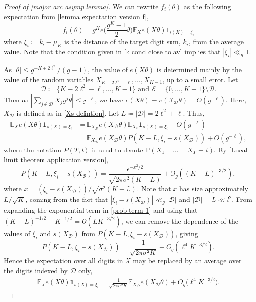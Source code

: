 \documentclass[hidelinks,11pt,reqno]{amsart}
\renewcommand{\leq}{\leqslant}
\newcommand{\E}{\ensuremath{\mathbb{E}}}
\newcommand{\prob}{\ensuremath{\mathbb{P}}}
\newcommand{\ind}{\mathbf{1}}
\newcommand{\xb}{X}
\newcommand{\xbd}{X_{\mathcal{D}}}
\newcommand{\xbee}{X_{\mathcal{E}}}
\newcommand{\sx}[1]{s(#1)}
\theoremstyle{remark}
\begin{document}
\begin{proof}[Proof of \cref{major arc asymp lemma}]
We can rewrite $f_{i}(\theta)$ as the following expectation from \cref{lemma expectation version f}, 
 \begin{equation}\label{equation f exp major arc}    
f_{i}(\theta)=g^{K}e\Big(\frac{g^{K}-1}{2}\theta\Big)\mathbb{E}_{\xb}e(\xb\theta)1_{\sx{\xb}=\xi_{i}}\end{equation}
where $\xi_{i}\coloneq k_{i}-\mu_{K}$ is the distance of the target digit sum, $k_{i}$, from the average value. Note that the condition given in \cref{k cond close to av} implies that $|\xi_{i}|\ll_{g} 1$. 

As $|\theta|\leq g^{-K+2\ell^{2}}/(g-1)$, the value of $e(\xb\theta)$ is determined mainly by the value of the random variables $X_{K-2\ell ^{2}-\ell},\ldots, X_{K-1}$, up to a small error. Let \[\mathcal{D}\coloneq \{K-2\ell ^{2}-\ell,\ldots, K-1\} \textrm{ and }\mathcal{E}=\{0,\ldots, K-1\}\setminus \mathcal{D}.\] Then as $|\sum_{j\notin \mathcal{D}}X_{j}g^{j}\theta|\leq g^{-\ell}$, we have  $e(\xb\theta)=e(\xbd\theta)+O(g^{-\ell})$. Here, $\xbd$ is defined as in \cref{Xs defintion}. Let $L\coloneq |\mathcal{D}| = 2\ell^{2}+\ell$. Thus,
\begin{align*}    \E_{\xb}e(\xb\theta)\ind_{\sx{\xb}=\xi_{i}}&=\E_{\xbd}e(\xbd\theta)\E_{\xbee}\ind_{\sx{\xb}=\xi_{i}}+O(g^{-\ell})\\
    &=\E_{\xbd}e(\xbd\theta)P(K-L,\xi_{i}-\sx{\xbd})+O(g^{-\ell}),
    \end{align*} 
where the notation $P(T,t)$ is used to denote $\prob(X_{1}+\ldots +X_{T}=t)$. By \cref{Local limit theorem application version},
\begin{equation}\label{prob term 1}
    P(K-L,\xi_{i}-\sx{\xbd})=\frac{e^{-x^{2}/2}}{\sqrt{2\pi\sigma^{2}(K-L)}}+O_{g}((K-L)^{-3/2}),
\end{equation}
where $x=(\xi_{i}-\sx{\xbd})/\sqrt{\sigma^{2}(K-L)}$. Note that $x$ has size approximately $L/\sqrt{K}$, coming from the fact that $|\xi_{i}-\sx{\xbd}|\ll_{g} |\mathcal{D}|$ and $|\mathcal{D}|=L\ll l^{2}$. From expanding the exponential term in \cref{prob term 1} and using that $(K-L)^{-1/2}-K^{-1/2}=O(LK^{-3/2})$, we can remove the dependence of the values of $\xi_{i}$ and $\sx{\xbd}$ from $P(K-L,\xi_{i}-\sx{\xbd})$, giving
 \[P(K-L,\xi_{i}-\sx{\xbd})=\frac{1}{\sqrt{2\pi\sigma^{2}K}}+O_{g}(\ell^{4}K^{-3/2}).\]
    Hence the expectation over all digits in $\xb$ may be replaced by an average over the digits indexed by $\mathcal{D}$ only,   \begin{align}\label{expectation over D}\E_{\xb}e(\xb\theta)\ind_{\sx{\xb}=\xi_{i}}=\frac{1}{\sqrt{2\pi\sigma^{2}K}}\E_{\xbd}e(\xbd\theta)+O_{g}\big (\ell^{4}K^{-3/2}\big ).

\end{align}
\end{proof}
\end{document}
